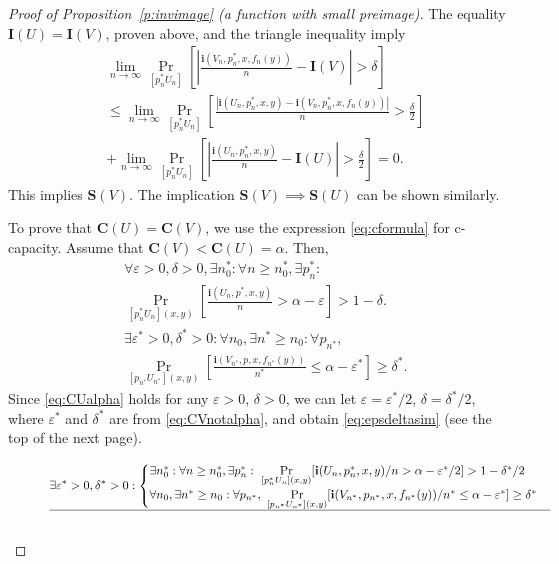 \documentclass[journal, twocol]{IEEEtran}
\newcommand{\bfC}{{\mathbf{C}}}
\newcommand{\bfI}{{\mathbf{I}}}
\newcommand{\bfS}{{\mathbf{S}}}
\newcommand{\abs}[1]{\left|{#1}\right|}
\newcommand{\brsq}[1]{{\left[{#1}\right]}}
\newcommand{\ve}{\varepsilon}
\newcommand{\bi}{\mathbf{i}}
\newcommand{\pW}[2]{[{#1}{#2}]}
\begin{document}
\begin{appendices}
\begin{proof}[Proof of Proposition~\ref{p:invimage} (a function with small preimage)]
The equality $\bfI(U)=\bfI(V)$, proven above, and the triangle inequality imply
\begin{align}
&\lim_{n\to\infty}\Pr_{\pW{p^*_n}{U_n}}\brsq{\abs{\frac{\bi(V_n,p^*_n,x,f_n(y))}{n}-\bfI(V)}>\delta}
\nonumber\\&
\leq\lim_{n\to\infty}\Pr_{\pW{p^*_n}{U_n}}\brsq{\frac{\abs{\bi(U_n,p^*_n,x,y)-\bi(V_n,p^*_n,x,f_n(y))}}{n}>\frac{\delta}{2}}
\nonumber\\&
+\lim_{n\to\infty}\Pr_{\pW{p^*_n}{U_n}}\brsq{\abs{\frac{\bi(U_n,p^*_n,x,y)}{n}-\bfI(U)}>\frac{\delta}{2}}=0.
\end{align}
This implies $\bfS(V)$.
The implication $\bfS(V)\implies\bfS(U)$ can be shown similarly.

To prove that $\bfC(U)=\bfC(V)$, we use the expression \eqref{eq:cformula} for  c-capacity.
Assume that $\bfC(V)<\bfC(U)=\alpha$.
Then,
\begin{align}
&\forall \ve>0,\delta>0, \exists n^*_0:\forall n \geq n^*_0, \exists p^*_n:
\nonumber\\&
\Pr_{\pW{p^*_n}{U_n}(x,y)}\brsq{\frac{\bi(U_n,p^*,x,y)}{n}> \alpha-\ve}>1-\delta. 
\label{eq:CUalpha}\\
&\exists \ve^*>0,\delta^*>0: \forall n_0, \exists n^* \geq n_0: \forall p_{n^*},
\nonumber\\&
\Pr_{\pW{p_{n^*}}{U_{n^*}}(x,y)}\brsq{\frac{\bi(V_{n^*},p,x,f_{n^*}(y))}{n^*}\leq \alpha-\ve^*}\geq\delta^*.
\label{eq:CVnotalpha}
\end{align}
Since \eqref{eq:CUalpha} holds for any $\ve>0$, $\delta>0$, we can let $\ve=\ve^*/2$, $\delta=\delta^*/2$, where $\ve^*$ and $\delta^*$ are from \eqref{eq:CVnotalpha}, and obtain \eqref{eq:epsdeltasim} (see the top of the next page).

\begin{figure}[t]
\begin{align}
\exists \ve^*>0,\delta^*>0: 
\begin{cases}
\exists n^*_0:\forall n \geq n^*_0, \exists p_n^*:~
\underset{\pW{p_n^*}{U_n}(x,y)}{\Pr}
\brsq{\bi(U_n,p_n^*,x,y)/n> \alpha-\ve^*/2}>1-\delta^*/2
\\
\forall n_0, \exists n^* \geq n_0: \forall p_{n^*},
~\underset{\pW{p_{n^*}}{U_{n^*}}(x,y)}{\Pr}\brsq{\bi(V_{n^*},p_{n^*},x,f_{n^*}(y))/{n^*}\leq \alpha-\ve^*}\geq\delta^*
\end{cases}
\label{eq:epsdeltasim}
\\ \hline \nonumber 
\end{align}    
\end{figure}


\end{proof}
\end{appendices}
\end{document}
